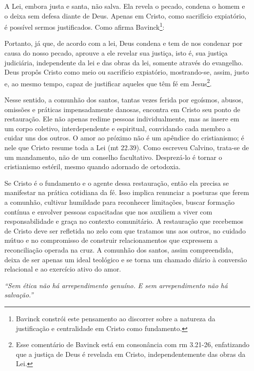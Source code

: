 A Lei, embora justa e santa, não salva. Ela revela o pecado, condena o homem e o deixa sem defesa diante de Deus. Apenas em Cristo, como sacrifício expiatório, é possível sermos justificados. Como afirma Bavinck\footnote{Bavinck constrói este pensamento ao discorrer sobre a natureza da justificação e centralidade em Cristo como fundamento.}:

\begin{citacao}
    Portanto, já que, de acordo com a lei, Deus condena e tem de nos condenar por causa do nosso pecado, aprouve a ele revelar sua justiça, isto é, sua justiça judiciária, independente da lei e das obras da lei, somente através do evangelho. Deus propôs Cristo como meio ou sacrifício expiatório, mostrando-se, assim, justo e, ao mesmo tempo, capaz de justificar aqueles que têm fé em Jesus\footnote{Esse comentário de Bavinck está em consonância com \gls{rm} 3.21-26, enfatizando que a justiça de Deus é revelada em Cristo, independentemente das obras da Lei.}. \cite[p.~212]{bavinck2012}
\end{citacao}

Nesse sentido, a comunhão dos santos, tantas vezes ferida por egoísmos, abusos, omissões e práticas impensadamente danosas, encontra em Cristo seu ponto de restauração. Ele não apenas redime pessoas individualmente, mas as insere em um corpo coletivo, interdependente e espiritual, convidando cada membro a cuidar uns dos outros. O amor ao próximo não é um apêndice do cristianismo; é nele que Cristo resume toda a Lei (\gls{mt} 22.39). Como escreveu Calvino, trata-se de um mandamento, não de um conselho facultativo. Desprezá-lo é tornar o cristianismo estéril, mesmo quando adornado de ortodoxia.

Se Cristo é o fundamento e o agente dessa restauração, então ela precisa se manifestar na prática cotidiana da fé. Isso implica renunciar a posturas que ferem a comunhão, cultivar humildade para reconhecer limitações, buscar formação contínua e envolver pessoas capacitadas que nos auxiliem a viver com responsabilidade e graça no contexto comunitário. A restauração que recebemos de Cristo deve ser refletida no zelo com que tratamos uns aos outros, no cuidado mútuo e no compromisso de construir relacionamentos que expressem a reconciliação operada na cruz. A comunhão dos santos, assim compreendida, deixa de ser apenas um ideal teológico e se torna um chamado diário à conversão relacional e ao exercício ativo do amor.

\textit{``Sem ética não há arrependimento genuíno. E sem arrependimento não há salvação.''} \cite[p.~102]{stott2008}

